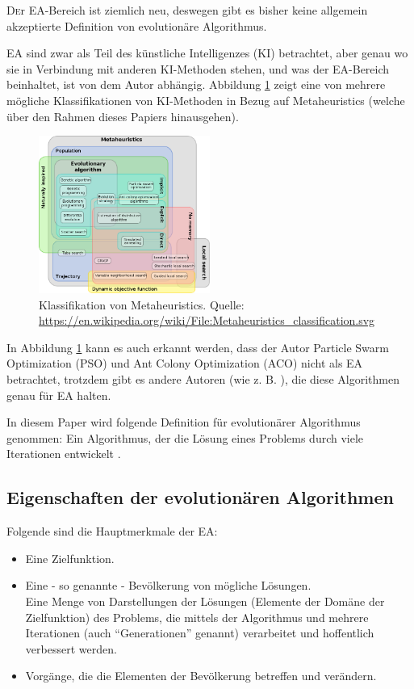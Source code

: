 \documentclass[twoside,twocolumn]{article}
\begin{document}
\lettrine[nindent=0em,lines=3]{D} er EA-Bereich ist ziemlich neu, deswegen gibt es bisher keine allgemein akzeptierte Definition von evolutionäre Algorithmus.\par
EA sind zwar als Teil des künstliche Intelligenzes (KI) betrachtet, aber genau wo sie in Verbindung mit anderen KI-Methoden stehen, und was der EA-Bereich beinhaltet, ist von dem Autor abhängig. Abbildung \ref{fig:metaheuristics} zeigt eine von mehrere mögliche Klassifikationen von KI-Methoden in Bezug auf Metaheuristics (welche über den Rahmen dieses Papiers hinausgehen).

\begin{figure}[h]
\caption{Klassifikation von Metaheuristics. Quelle: \url{https://en.wikipedia.org/wiki/File:Metaheuristics_classification.svg}}
\label{fig:metaheuristics}
\centering
\includegraphics[width=0.5\textwidth]{images/metaheuristics_classification.png}
\end{figure}

In Abbildung \ref{fig:metaheuristics} kann es auch erkannt werden, dass der Autor Particle Swarm Optimization (PSO) und Ant Colony Optimization (ACO) nicht als EA betrachtet, trotzdem gibt es andere Autoren (wie z. B. \cite{wiley_evolutionary}), die diese Algorithmen genau für EA halten.\par

In diesem Paper wird folgende Definition für evolutionärer Algorithmus genommen: Ein Algorithmus, der die Lösung eines Problems durch viele Iterationen entwickelt    .

\subsection{Eigenschaften der evolutionären Algorithmen}
Folgende sind die Hauptmerkmale der EA:

\begin{itemize}
\item{Eine Zielfunktion.}\\
\item{Eine - so genannte - Bevölkerung von mögliche Lösungen.}\\
Eine Menge von Darstellungen der Lösungen (Elemente der Domäne der Zielfunktion) des Problems, die mittels der Algorithmus und mehrere Iterationen (auch \enquote{Generationen} genannt) verarbeitet und hoffentlich verbessert werden.\\
\item{Vorgänge, die die Elementen der Bevölkerung betreffen und verändern.}
\end{itemize}
\end{document}
